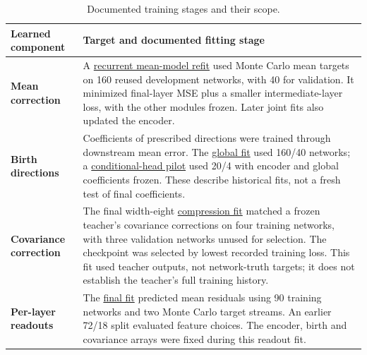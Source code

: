 \documentclass[11pt,letterpaper]{article}
\begin{document}
\begin{table}[htbp]
\centering
\small
\caption{Documented training stages and their scope.}\label{tab:training}
\begin{tabular}{@{}>{\raggedright\arraybackslash}p{}>{\raggedright\arraybackslash}p{}@{}}
\toprule
Learned component & Target and documented fitting stage \\
\midrule
\textbf{Mean correction} & A \href{https://github.com/mattliston/arc-whitebox-estimation-challenge/blob/main/records/research/2026-09-21-cpu-estimator-mean-encoder-refit-first-backward-pass-exceeded/PROTOCOL.md\#L81}{recurrent mean-model refit} used Monte Carlo mean targets on 160 reused development networks, with 40 for validation. It minimized final-layer MSE plus a smaller intermediate-layer loss, with the other modules frozen. Later joint fits also updated the encoder. \\[3pt]
\textbf{Birth directions} & Coefficients of prescribed directions were trained through downstream mean error. The \href{https://github.com/mattliston/arc-whitebox-estimation-challenge/blob/main/experiments/birth-terms/four-fitted-birth-directions-pass-native40-independent14-adjusted-ratios/PROTOCOL.md\#L85}{global fit} used 160/40 networks; a \href{https://github.com/mattliston/arc-whitebox-estimation-challenge/blob/main/experiments/learned-correction/birth-direction-neural-correction-improves-adjusted-error-2-093318322829274/PROTOCOL.md\#L104}{conditional-head pilot} used 20/4 with encoder and global coefficients frozen. These describe historical fits, not a fresh test of final coefficients. \\[3pt]
\textbf{Covariance correction} & The final width-eight \href{https://github.com/mattliston/arc-whitebox-estimation-challenge/blob/main/experiments/learned-correction/learned-edge-hidden-width-eight-150665691-mac-2338808-fresh/code/fit_edge_hidden_v1.py\#L171}{compression fit} matched a frozen teacher's covariance corrections on four training networks, with three validation networks unused for selection. The checkpoint was selected by lowest recorded training loss. This fit used teacher outputs, not network-truth targets; it does not establish the teacher's full training history. \\[3pt]
\textbf{Per-layer readouts} & The \href{https://github.com/mattliston/arc-whitebox-estimation-challenge/blob/main/release/common/readout/fit_blocks_full90_v1.py\#L20}{final fit} predicted mean residuals using 90 training networks and two Monte Carlo target streams. An earlier 72/18 split evaluated feature choices. The encoder, birth and covariance arrays were fixed during this readout fit. \\[3pt]
\bottomrule
\end{tabular}
\end{table}
\end{document}
